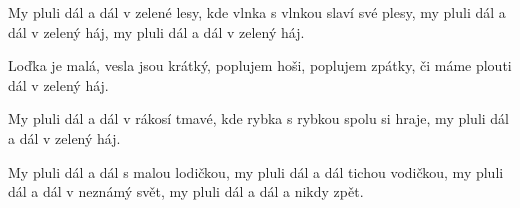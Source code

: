 
\beginverse{}
My pluli dál a dál v zelené lesy,
kde vlnka s vlnkou slaví své plesy,
my pluli dál a dál v zelený háj,
my pluli dál a dál v zelený háj.
\endverse{}

\beginverse{}
Loďka je malá, vesla jsou krátký,
poplujem hoši, poplujem zpátky,
\lrep{}či máme plouti dál v zelený háj. \rrep{}
\endverse{}

\beginverse{}
My pluli dál a dál v rákosí tmavé,
kde rybka s rybkou spolu si hraje,
\lrep{}my pluli dál a dál v zelený háj. \rrep{}
\endverse{}

\beginverse{}
My pluli dál a dál s malou lodičkou,
my pluli dál a dál tichou vodičkou,
my pluli dál a dál v neznámý svět,
my pluli dál a dál a nikdy zpět.
\endverse{}

\endsong{}
